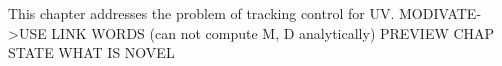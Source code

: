 

This chapter addresses the problem of tracking control for \ac{UV}.
%
MODIVATE->USE LINK WORDS
(can not compute M, D analytically)
%
PREVIEW CHAP
%
STATE WHAT IS NOVEL
%






